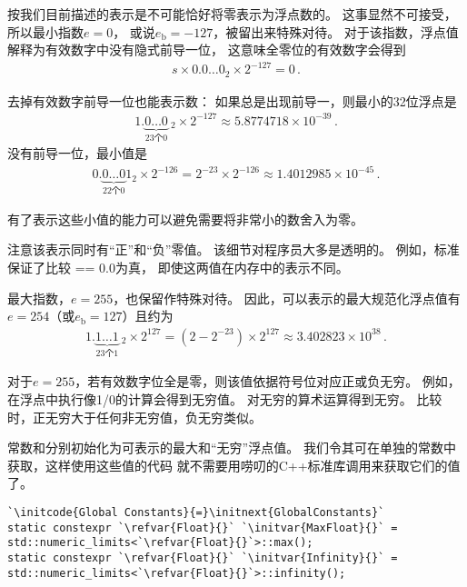 按我们目前描述的表示是不可能恰好将零表示为浮点数的。
这事显然不可接受，所以最小指数$e=0$，
或说$e_{\mathrm{b}}=-127$，被留出来特殊对待。
对于该指数，浮点值解释为有效数字中没有隐式前导一位，
这意味全零位的有效数字会得到
\begin{align*}
    s\times0.0\ldots0_2\times2^{-127}=0\, .
\end{align*}

去掉有效数字前导一位也能表示数：
如果总是出现前导一，则最小的32位浮点是
\begin{align*}
    1.{\underbrace{0\ldots0}_{\text{23个0}}}\ _2\times2^{-127}\approx5.8774718\times10^{-39}\, .
\end{align*}
没有前导一位，最小值是
\pagebreak %
\begin{align*}
    0.\underbrace{0\ldots0}_{\text{22个0}}1_2\times2^{-126}=2^{-23}\times2^{-126}\approx1.4012985\times10^{-45}\, .
\end{align*}

有了表示这些小值的能力可以避免需要将非常小的数舍入为零。

注意该表示同时有“正”和“负”零值。
该细节对程序员大多是透明的。
例如，标准保证了比较{ == 0.0}为真，
即使这两值在内存中的表示不同。

最大指数，$e=255$，也保留作特殊对待。
因此，可以表示的最大规范化浮点值有$e=254$（或$e_{\mathrm{b}}=127$）且约为
\begin{align*}
    1.{\underbrace{1\ldots1}_{\text{23个1}}}\ _2\times2^{127}=(2-2^{-23})\times2^{127}\approx3.402823\times10^{38}\, .
\end{align*}

对于$e=255$，若有效数字位全是零，则该值依据符号位对应正或负无穷。
例如，在浮点中执行像1/0的计算会得到无穷值。
对无穷的算术运算得到无穷。
比较时，正无穷大于任何非无穷值，负无穷类似。

常数和分别初始化为可表示的最大和“无穷”浮点值。
我们令其可在单独的常数中获取，这样使用这些值的代码
就不需要用唠叨的C++标准库调用来获取它们的值了。
\begin{lstlisting}
`\initcode{Global Constants}{=}\initnext{GlobalConstants}`
static constexpr `\refvar{Float}{}` `\initvar{MaxFloat}{}` = std::numeric_limits<`\refvar{Float}{}`>::max();
static constexpr `\refvar{Float}{}` `\initvar{Infinity}{}` = std::numeric_limits<`\refvar{Float}{}`>::infinity();
\end{lstlisting}

